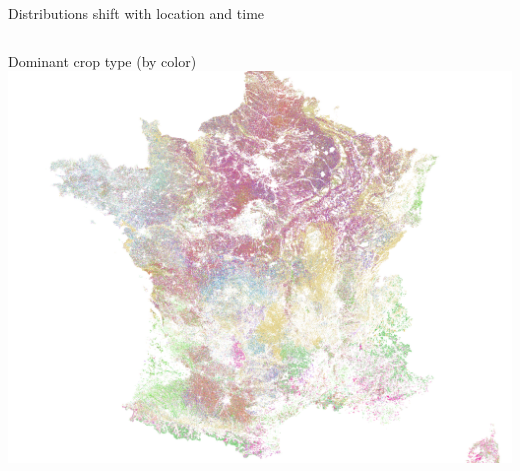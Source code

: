 \documentclass[11pt]{beamer}
\begin{document}
	\begin{frame}{Distributions shift with location and time}
		\begin{columns}[t]
			Dominant crop type (by color)
			\includegraphics[width=\textwidth]{images/france_crop_distribution}
			

\end{columns}
\end{frame}
\end{document}
